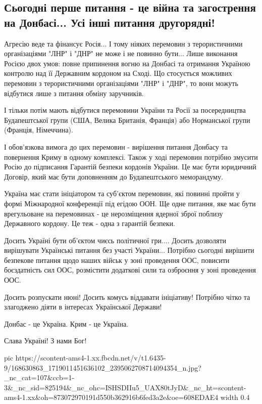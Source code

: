  
 
 
 
 

\subsection{Сьогодні перше питання - це війна та загострення на Донбасі... Усі інші питання другорядні! }
\label{sec:05_04_2021.fb.martynenko_alexander.2.donbass_vojna_rossia_ukraina}

Агресію веде та фінансує Росія... І тому ніяких перемовин з терористичними
організаціями "ЛНР" і "ДНР"  не може і не повинно бути... Лише виконання Росією
двох умов: повне припинення вогню на Донбасі та отримання Україною контролю над
її Державним  кордоном на Сході.  Що стосується можливих перемовин з
терористичними організаціями "ЛНР" і "ДНР", то  вони можуть відбутися лише з
питання обміну заручників. 

І тільки потім мають відбутися перемовини України та Росії за посередництва
Будапештської групи (США, Велика Британія, Франція)  або Норманської групи
(Франція, Німеччина). 

І обов'язкова вимога до цих перемовин - вирішення питання Донбасу та повернення
Криму в одному комплексі.  Також у ході перемовин потрібно змусити Росію до
підписання Гарантій безпеки кордонів України. Це має бути юридичний Договір,
який має бути доповненням до Будапештського меморандуму. 

Україна має стати ініціатором та суб'єктом перемовин, які повинні пройти у
формі Міжнародної конференції під егідою ООН.  Ще одне питання, яке має бути
врегульоване на перемовинах - це нерозміщення ядерної зброї поблизу Державного
кордону. Це теж - одна з гарантій безпеки.   

Досить Україні бути об'єктом чиєсь політичної гри.... Досить дозволяти
вирішувати Українські питання без участі України... Потрібно сьогодні вирішити
безпекове питання щодо наших військ у зоні проведення ООС, повисити
боєздатність сил ООС, розмістити додаткові сили та озброєння у зоні проведення
ООС.  

Досить розпускати нюні! Досить комусь віддавати ініціативу! Потрібно чітко та
злагоджено діяти в інтересах Української Держави!    

Донбас - це Україна. Крим - це Україна.

Слава Україні! З нами Бог!

\ifcmt
  pic https://scontent-ams4-1.xx.fbcdn.net/v/t1.6435-9/168630863_1719011451636102_2395062708714094354_n.jpg?_nc_cat=107&ccb=1-3&_nc_sid=825194&_nc_ohc=ISHSDIIu5_UAX80tJyD&_nc_ht=scontent-ams4-1.xx&oh=873072970191d550b362916b6fed3a2e&oe=608EDAE4
  width 0.4
\fi

